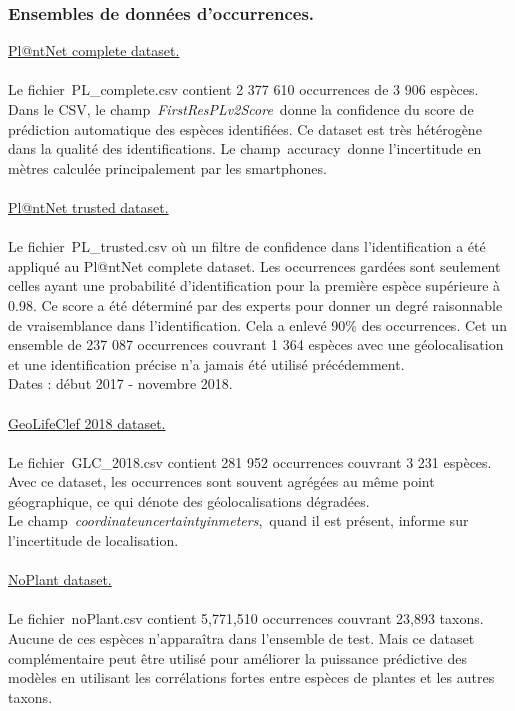 \documentclass{article}
\begin{document}
\subsubsection{Ensembles de données d'occurrences.}\underline{Pl@ntNet complete dataset.}
\\
\\
Le fichier PL\_complete.csv contient 2 377 610 occurrences de 3 906 espèces. Dans le CSV, le champ \textit{FirstResPLv2Score} donne la confidence du score de prédiction automatique des espèces identifiées. Ce dataset est très hétérogène dans la qualité des identifications. Le champ accuracy donne l’incertitude en mètres calculée principalement par les smartphones.
\\
\\
\underline{Pl@ntNet trusted dataset.}
\\
\\
Le fichier PL\_trusted.csv où un filtre de confidence dans l’identification a été appliqué au Pl@ntNet complete dataset. Les occurrences gardées sont seulement celles ayant une probabilité d’identification pour la première espèce supérieure à 0.98. Ce score a été déterminé par des experts pour donner un degré raisonnable de vraisemblance dans l’identification. Cela a enlevé 90\% des occurrences. Cet un ensemble de 237 087 occurrences couvrant 1 364 espèces avec une géolocalisation et une identification précise n’a jamais été utilisé précédemment.
\\
Dates : début 2017 - novembre 2018.
\\
\\
\underline{GeoLifeClef 2018 dataset.}
\\
\\
Le fichier GLC\_2018.csv contient 281 952 occurrences couvrant 3 231 espèces. Avec ce dataset, les occurrences sont souvent agrégées au même point géographique, ce qui dénote des géolocalisations dégradées.\\ Le champ \textit{coordinateuncertaintyinmeters}, quand il est présent, informe sur l’incertitude de localisation.
\\
\\
\underline{NoPlant dataset.}
\\
\\
Le fichier noPlant.csv contient 5,771,510 occurrences couvrant 23,893 taxons. Aucune de ces espèces n'apparaîtra dans l’ensemble de test. Mais ce dataset complémentaire peut être utilisé pour améliorer la puissance prédictive des modèles en utilisant les corrélations fortes entre espèces de plantes et les autres taxons.
\end{document}
